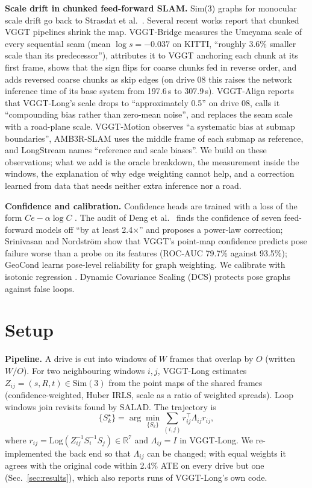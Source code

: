 \documentclass[conference]{IEEEtran}
\newcommand{\Log}{\mathrm{Log}}
\begin{document}
\textbf{Scale drift in chunked feed-forward SLAM.} Sim(3) graphs for monocular scale drift go back to Strasdat et
al.~\cite{strasdat}. Several recent works report that chunked VGGT pipelines shrink the map. VGGT-Bridge \cite{bridge}
measures the Umeyama scale of every sequential seam (mean $\log s=-0.037$ on KITTI, ``roughly 3.6\% smaller scale than
its predecessor''), attributes it to VGGT anchoring each chunk at its first frame, shows that the sign flips for coarse
chunks fed in reverse order, and adds reversed coarse chunks as skip edges (on drive 08 this raises the network inference time of its base system
from 197.6\,s to 307.9\,s). VGGT-Align
\cite{align} reports that VGGT-Long's scale drops to ``approximately 0.5'' on drive 08, calls it ``compounding bias rather
than zero-mean noise'', and replaces the seam scale with a road-plane scale. VGGT-Motion \cite{motion} observes ``a
systematic bias at submap boundaries'', AMB3R-SLAM \cite{amb3r} uses the middle frame of each submap as reference, and
LongStream \cite{longstream} names ``reference and scale biases''. We build on these observations; what we add is the
oracle breakdown, the measurement inside the windows, the explanation of why edge weighting cannot help, and a
correction learned from data that needs neither extra inference nor a road.

\textbf{Confidence and calibration.} Confidence heads are trained with a loss of the form $Ce-\alpha\log C$ \cite{kendall}.
The audit of Deng et al.~\cite{audit} finds the confidence of seven feed-forward models off ``by at least 2.4$\times$''
and proposes a power-law correction; Srinivasan and Nordstr\"om \cite{knows} show that VGGT's point-map confidence
predicts pose failure worse than a probe on its features (ROC-AUC 79.7\% against 93.5\%); GeoCond \cite{geocond} learns
pose-level reliability for graph weighting. We calibrate with isotonic regression \cite{kuleshov}. Dynamic Covariance
Scaling (DCS) \cite{dcs} protects pose graphs against false loops.

\section{Setup}
\label{sec:setup}

\textbf{Pipeline.} A drive is cut into windows of $W$ frames that overlap by $O$ (written $W/O$). For two neighbouring
windows $i,j$, VGGT-Long estimates $Z_{ij}=(s,R,t)\in\mathrm{Sim}(3)$ from the point maps of the shared frames
(confidence-weighted, Huber IRLS, scale as a ratio of weighted spreads). Loop windows join revisits found by SALAD. The
trajectory is
\begin{equation}
\{S_k^\star\}=\arg\min_{\{S_k\}}\sum_{(i,j)}r_{ij}^\top\Lambda_{ij}r_{ij},
\label{eq:graph}
\end{equation}
where $r_{ij}=\Log(Z_{ij}^{-1}S_i^{-1}S_j)\in\mathbb{R}^7$ and $\Lambda_{ij}=I$ in VGGT-Long. We re-implemented the
back end so that $\Lambda_{ij}$ can be changed; with equal weights it agrees with the original code within 2.4\% ATE on
every drive but one (Sec.~\ref{sec:results}), which also reports runs of VGGT-Long's own code.
\end{document}
